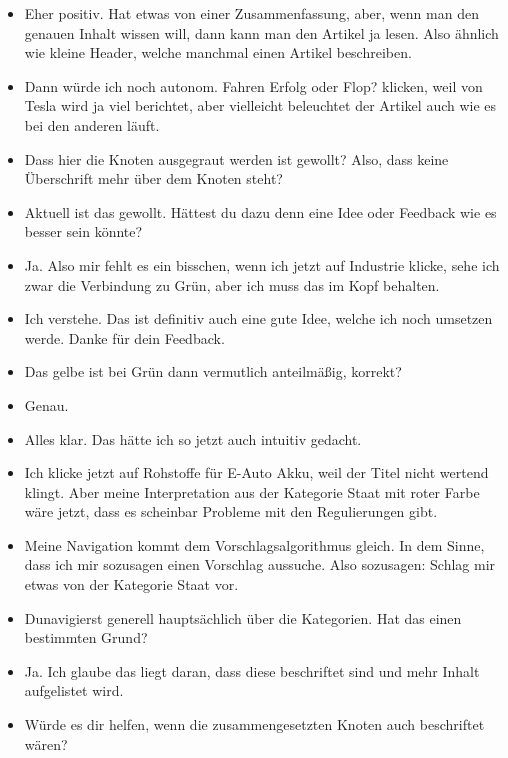 {\begin{itemize}[]
        \item {} Eher positiv.
              Hat etwas von einer Zusammenfassung, aber, wenn man den genauen Inhalt wissen will, dann kann man den Artikel ja lesen.
              Also ähnlich wie kleine Header, welche manchmal einen Artikel beschreiben.
        \item {} Dann würde ich noch \flqq autonom. Fahren Erfolg oder Flop?\frqq{} klicken, weil von Tesla wird ja viel berichtet, aber vielleicht beleuchtet der Artikel auch wie es bei den anderen läuft.
        \item {} Dass hier die Knoten ausgegraut werden ist gewollt?
              Also, dass keine Überschrift mehr über dem Knoten steht?
        \item {} Aktuell ist das gewollt. Hättest du dazu denn eine Idee oder Feedback wie es besser sein könnte?
        \item {} Ja. Also mir fehlt es ein bisschen, wenn ich jetzt auf Industrie klicke, sehe ich zwar die Verbindung zu Grün, aber ich muss das im Kopf behalten.
        \item {} Ich verstehe. Das ist definitiv auch eine gute Idee, welche ich noch umsetzen werde. Danke für dein Feedback.
        \item {} Das gelbe ist bei Grün dann vermutlich anteilmäßig, korrekt?
        \item {} Genau.
        \item {} Alles klar. Das hätte ich so jetzt auch intuitiv gedacht.
        \item {} Ich klicke jetzt auf \flqq Rohstoffe für E-Auto Akku\frqq{}, weil der Titel nicht wertend klingt.
              Aber meine Interpretation aus der Kategorie Staat mit roter Farbe wäre jetzt, dass es scheinbar Probleme mit den Regulierungen gibt.
        \item {} Meine Navigation kommt dem Vorschlagsalgorithmus gleich.
              In dem Sinne, dass ich mir sozusagen einen Vorschlag aussuche.
              Also sozusagen: Schlag mir etwas von der Kategorie Staat vor.
        \item {} Dunavigierst generell hauptsächlich über die Kategorien. Hat das einen bestimmten Grund?
        \item {} Ja. Ich glaube das liegt daran, dass diese beschriftet sind und mehr Inhalt aufgelistet wird.
        \item {} Würde es dir helfen, wenn die zusammengesetzten Knoten auch beschriftet wären?

\end{itemize}}

